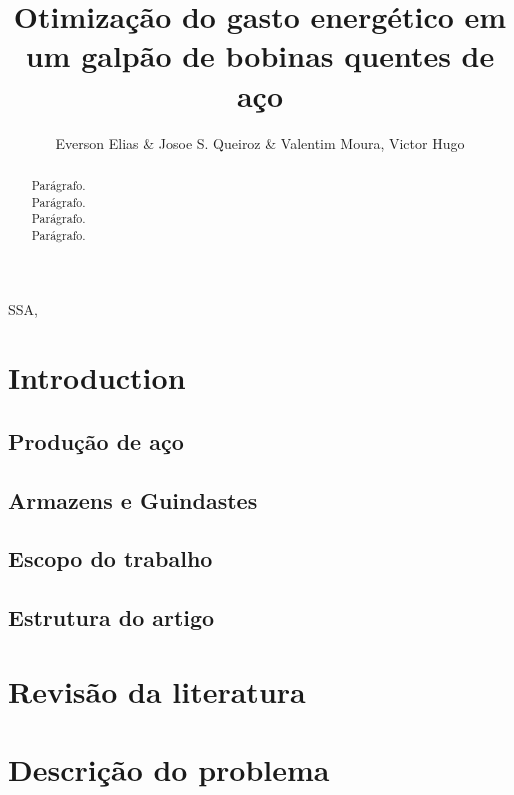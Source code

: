 \documentclass[journal]{IEEEtran}
\begin{document}
    \title{Otimização do gasto energético em um galpão de bobinas quentes de aço}
    \nocite{*}
    \author{Everson Elias \& Josoe S. Queiroz \& Valentim Moura, Victor Hugo} 
    
    \maketitle
    	
    \begin{abstract}
        Parágrafo.\\
        Parágrafo.\\
        Parágrafo.\\
        Parágrafo.
    \end{abstract}
    
    \begin{IEEEkeywords}
        SSA, 
    \end{IEEEkeywords}
    
    \section{Introduction}
        \subsection{Produção de aço}
        
        \subsection{Armazens e Guindastes}

        \subsection{Escopo do trabalho}

        \subsection{Estrutura do artigo}

        
    \section{Revisão da literatura}
        
    \section{Descrição do problema}
\end{document}
